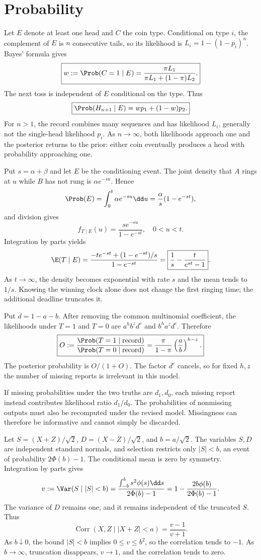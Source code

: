 \section{Probability}

Let $E$ denote at least one head and $C$ the coin type. Conditional on type $i$, the complement of $E$ is $n$ consecutive tails, so its likelihood is $L_i=1-(1-p_i)^n$. Bayes' formula gives
\[
\boxed{w:=\Prob(C=1\mid E)=\frac{\pi L_1}{\pi L_1+(1-\pi)L_2}.}
\]
The next toss is independent of $E$ conditional on the type. Thus
\[
\boxed{\Prob(H_{n+1}\mid E)=wp_1+(1-w)p_2.}
\]
For $n>1$, the record combines many sequences and has likelihood $L_i$, generally not the single-head likelihood $p_i$. As $n\to\infty$, both likelihoods approach one and the posterior returns to the prior: either coin eventually produces a head with probability approaching one.

Put $s=\alpha+\beta$ and let $E$ be the conditioning event. The joint density that $A$ rings at $u$ while $B$ has not rung is $\alpha e^{-su}$. Hence
\[
\Prob(E)=\int_0^t\alpha e^{-su}\dd u=\frac\alpha s(1-e^{-st}),
\]
and division gives
\[
\boxed{f_{T\mid E}(u)=\frac{s e^{-su}}{1-e^{-st}},\quad0<u<t.}
\]
Integration by parts yields
\[
\E(T\mid E)=\frac{-t e^{-st}+(1-e^{-st})/s}{1-e^{-st}}
=\boxed{\frac1s-\frac{t}{e^{st}-1}}.
\]
As $t\to\infty$, the density becomes exponential with rate $s$ and the mean tends to $1/s$. Knowing the winning clock alone does not change the first ringing time; the additional deadline truncates it.

Put $d=1-a-b$. After removing the common multinomial coefficient, the likelihoods under $T=1$ and $T=0$ are $a^hb^zd^e$ and $b^ha^zd^e$. Therefore
\[
\boxed{O:=\frac{\Prob(T=1\mid\text{record})}{\Prob(T=0\mid\text{record})}
=\frac\pi{1-\pi}\left(\frac ab\right)^{h-z}.}
\]
The posterior probability is $O/(1+O)$. The factor $d^e$ cancels, so for fixed $h,z$ the number of missing reports is irrelevant in this model.

If missing probabilities under the two truths are $d_1,d_0$, each missing report instead contributes likelihood ratio $d_1/d_0$. The probabilities of nonmissing outputs must also be recomputed under the revised model. Missingness can therefore be informative and cannot simply be discarded.

Let $S=(X+Z)/\sqrt2$, $D=(X-Z)/\sqrt2$, and $b=a/\sqrt2$. The variables $S,D$ are independent standard normals, and selection restricts only $|S|<b$, an event of probability $2\Phi(b)-1$. The conditional mean is zero by symmetry. Integration by parts gives
\[
v:=\Var(S\mid |S|<b)
=\frac{\int_{-b}^b s^2\phi(s)\dd s}{2\Phi(b)-1}
=1-\frac{2b\phi(b)}{2\Phi(b)-1}.
\]
The variance of $D$ remains one, and it remains independent of the truncated $S$. Thus
\[
\boxed{\operatorname{Corr}(X,Z\mid |X+Z|<a)=\frac{v-1}{v+1}.}
\]
As $b\downarrow0$, the bound $|S|<b$ implies $0\le v\le b^2$, so the correlation tends to $-1$. As $b\to\infty$, truncation disappears, $v\to1$, and the correlation tends to zero.

